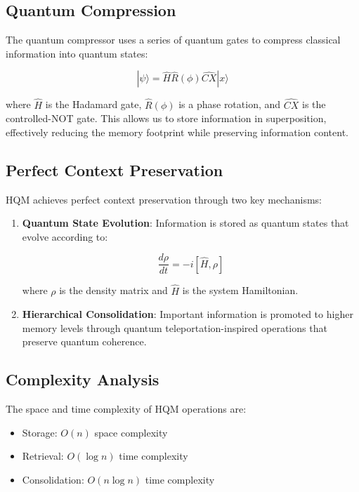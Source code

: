 \documentclass[10pt,journal,compsoc]{IEEEtran}
\begin{document}
\subsection{Quantum Compression}

The quantum compressor uses a series of quantum gates to compress classical information into quantum states:

\begin{equation}
    |\psi\rangle = \hat{H}\hat{R}(\phi)\hat{CX}|x\rangle
\end{equation}

where $\hat{H}$ is the Hadamard gate, $\hat{R}(\phi)$ is a phase rotation, and $\hat{CX}$ is the controlled-NOT gate. This allows us to store information in superposition, effectively reducing the memory footprint while preserving information content.

\subsection{Perfect Context Preservation}

HQM achieves perfect context preservation through two key mechanisms:

\begin{enumerate}
    \item \textbf{Quantum State Evolution}: Information is stored as quantum states that evolve according to:
    
    \begin{equation}
        \frac{d\rho}{dt} = -i[\hat{H}, \rho]
    \end{equation}
    
    where $\rho$ is the density matrix and $\hat{H}$ is the system Hamiltonian.
    
    \item \textbf{Hierarchical Consolidation}: Important information is promoted to higher memory levels through quantum teleportation-inspired operations that preserve quantum coherence.
\end{enumerate}

\subsection{Complexity Analysis}

The space and time complexity of HQM operations are:

\begin{itemize}
    \item Storage: $O(n)$ space complexity
    \item Retrieval: $O(\log n)$ time complexity
    \item Consolidation: $O(n \log n)$ time complexity
\end{itemize}
\end{document}
